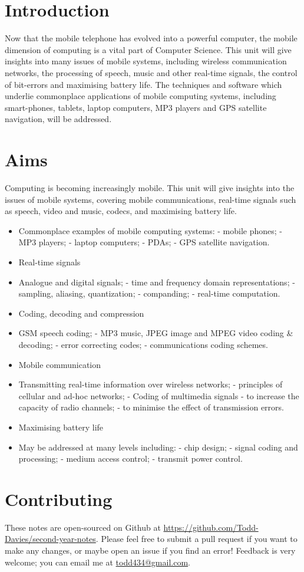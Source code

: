 \section*{Introduction}

Now that the mobile telephone has evolved into a powerful computer, the mobile
dimension of computing is a vital part of Computer Science. This unit will give
insights into many issues of mobile systems, including wireless communication
networks, the processing of speech, music and other real-time signals, the
control of bit-errors and maximising battery life. The techniques and software
which underlie commonplace applications of mobile computing systems, including
smart-phones, tablets, laptop computers, MP3 players and GPS satellite
navigation, will be addressed.

\section*{Aims}

Computing is becoming increasingly mobile. This unit will give insights into the
issues of mobile systems, covering mobile communications, real-time signals such
as speech, video and music, codecs, and maximising battery life.

\begin{itemize}
  \item Commonplace examples of mobile computing systems: - mobile phones; - MP3 players; - laptop computers; - PDAs; - GPS satellite navigation.
  \item Real-time signals
  \item Analogue and digital signals; - time and frequency domain representations; - sampling, aliasing, quantization; - companding; - real-time computation.
  \item Coding, decoding and compression
  \item GSM speech coding; - MP3 music, JPEG image and MPEG video coding \& decoding; - error correcting codes; - communications coding schemes.
  \item Mobile communication
  \item Transmitting real-time information over wireless networks; - principles of cellular and ad-hoc networks; - Coding of multimedia signals - to increase the capacity of radio channels; - to minimise the effect of transmission errors.
  \item Maximising battery life
  \item May be addressed at many levels including: - chip design; - signal coding and processing; - medium access control; - transmit power control.
\end{itemize}

\section*{Contributing}

These notes are open-sourced on Github at
\url{https://github.com/Todd-Davies/second-year-notes}. Please feel free to
submit a pull request if you want to make any changes, or maybe open an issue
if you find an error! Feedback is very welcome; you can email me at
\href{mailto:todd434@gmail.com}{todd434@gmail.com}.
